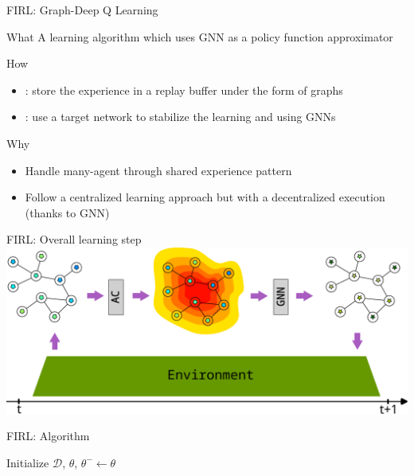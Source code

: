 \documentclass[presentation, 8pt,169]{beamer}\mode<presentation>{\usetheme{AMSBolognaFC}}
\begin{document}
\begin{frame}{FIRL: Graph-Deep Q Learning}
  \begin{block}{What}
    A learning algorithm which uses GNN as a policy function approximator
  \end{block}
  \begin{block}{How}
    \begin{itemize}
      \item {}: store the experience in a replay buffer under the form of graphs
      \item {}: use a target network to stabilize the learning and using GNNs
    \end{itemize}
  \end{block}
  \begin{alertblock}{Why}
    \begin{itemize}
      \item Handle many-agent through shared experience pattern 
      \item Follow a centralized learning approach but with a decentralized execution (thanks to GNN)
    \end{itemize}
  \end{alertblock}
\end{frame}
\begin{frame}{FIRL: Overall learning step}
\includegraphics[width=\textwidth]{img/architecture.pdf}
\end{frame}
\begin{frame}{FIRL: Algorithm}
  \begin{algorithm}[H]
    Initialize $\mathcal{D}$, $\theta$, $\theta^- \leftarrow \theta$\;
    \end{algorithm}
\end{frame}
\end{document}
